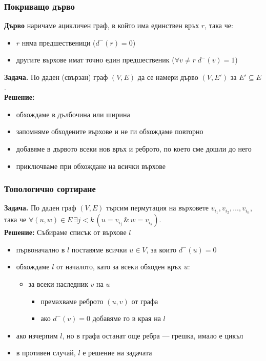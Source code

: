 \documentclass[alsotrans,beameroptions={aspectratio=169}]{beamerswitch}
\begin{document}
\begin{frame}
  \frametitle{Покриващо дърво}
  \begin{definition}
    \small
    \textbf{Дърво} наричаме ацикличен граф, в който има единствен връх $r$, така че:
    \begin{itemize}
    \item $r$ няма предшественици ($d^-(r) = 0$)
    \item другите върхове имат точно един предшественик ($\forall v\neq r\;d^-(v) = 1$)
    \end{itemize}
  \end{definition}
  \pause
  \textbf{Задача. }По даден (свързан) граф $(V,E)$ да се намери дърво $(V,E')$ за $E' \subseteq E$.\\
  \pause
  \textbf{Решение:}\\
  \begin{itemize}[<+->]
  \item обхождаме в дълбочина или ширина
  \item запомняме обходените върхове и не ги обхождаме повторно
  \item добавяме в дървото всеки нов връх и реброто, по което сме дошли до него
  \item приключваме при обхождане на всички върхове
  \end{itemize}
\end{frame}

\begin{frame}
  \frametitle{Топологично сортиране}
  \textbf{Задача. }По даден граф $(V,E)$ търсим пермутация на върховете $v_{i_1},v_{i_2},\ldots,v_{i_n}$, така че $\forall (u,w)\in E\,\exists j < k\,(u = v_{i_j}\,\&\,w = v_{i_k})$.\\
  \pause
  \textbf{Решение: }Събираме списък от върхове $l$\\
  \begin{itemize}[<+->]
  \item първоначално в $l$ поставяме всички $u\in V$, за които $d^-(u) = 0$
  \item обхождаме $l$ от началото, като за всеки обходен връх $u$:
    \begin{itemize}
    \item за всеки наследник $v$ на $u$
      \begin{itemize}
      \item премахваме реброто $(u,v)$ от графа
      \item ако $d^-(v) = 0$ добавяме го в края на $l$
      \end{itemize}
    \end{itemize}
  \item ако изчерпим $l$, но в графа останат още ребра --- грешка, имало е цикъл
  \item в противен случай, $l$ е решение на задачата
  \end{itemize}
\end{frame}
\end{document}
